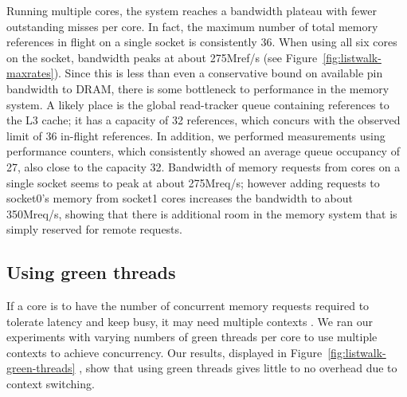 	Running multiple cores, the system reaches a bandwidth plateau with fewer outstanding misses per core. In fact, the maximum number of total memory references in flight on a single socket is consistently 36. When using all six cores on the socket, bandwidth peaks at about 275Mref/s (see Figure~\ref{fig:listwalk-maxrates}). Since this is less than even a conservative bound on available pin bandwidth to DRAM, there is some bottleneck to performance in the memory system. A likely place is the global read-tracker queue containing references to the L3 cache; it has a capacity of 32 references, which concurs with the observed limit of 36 in-flight references. In addition, we performed measurements using performance counters, which consistently showed an average queue occupancy of 27, also close to the capacity 32.
   
	Bandwidth of memory requests from cores on a single socket seems to peak at about 275Mreq/s; however adding requests to socket0's memory from socket1 cores increases the bandwidth to about 350Mreq/s, showing that there is additional room in the memory system that is simply reserved for remote requests.


\subsection{Using green threads}
	If a core is to have the number of concurrent memory requests required to tolerate latency and keep busy, it may need multiple contexts .  We ran our experiments with varying numbers of green threads per core to use multiple contexts to achieve concurrency. Our results, displayed in Figure~\ref{fig:listwalk-green-threads} , show that using green threads gives little to no overhead due to context switching. 


